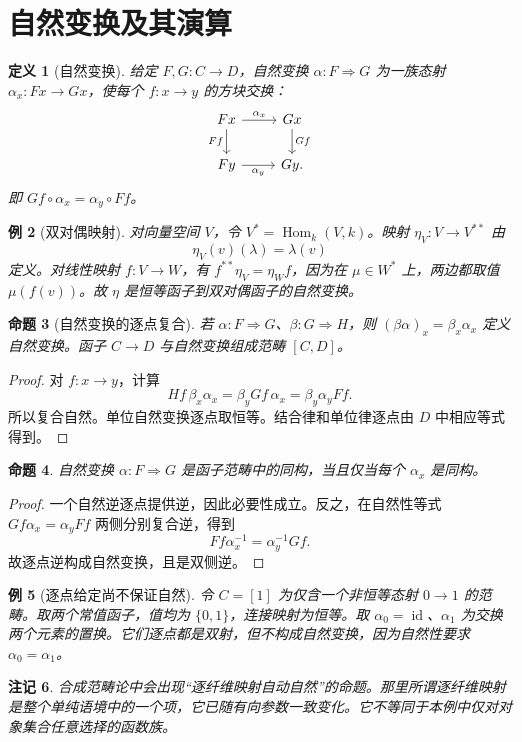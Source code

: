 \documentclass[12pt,oneside,openany,fontset=none]{ctexbook}
\theoremstyle{cn}
\newtheorem{definition}{定义}[chapter]
\newtheorem{example}[definition]{例}
\newtheorem{proposition}[definition]{命题}
\newtheorem{remark}[definition]{注记}
\numberwithin{equation}{chapter}
\newcommand{\id}{\operatorname{id}}
\newcommand{\Hom}{\operatorname{Hom}}
\begin{document}
\section{自然变换及其演算}
\begin{definition}[自然变换]
给定 $F,G:C\to D$，自然变换 $\alpha:F\Rightarrow G$ 为一族态射 $\alpha_x:Fx\to Gx$，使每个 $f:x\to y$ 的方块交换：
\[
\begin{tikzcd}
Fx\ar[r,"\alpha_x"]\ar[d,"Ff"']&Gx\ar[d,"Gf"]\\
Fy\ar[r,"\alpha_y"']&Gy.
\end{tikzcd}
\]
即 $Gf\circ\alpha_x=\alpha_y\circ Ff$。
\end{definition}
\begin{example}[双对偶映射]
对向量空间 $V$，令 $V^*=\Hom_k(V,k)$。映射 $\eta_V:V\to V^{**}$ 由
\[
\eta_V(v)(\lambda)=\lambda(v)
\]
定义。对线性映射 $f:V\to W$，有 $f^{**}\eta_V=\eta_Wf$，因为在 $\mu\in W^*$ 上，两边都取值 $\mu(f(v))$。故 $\eta$ 是恒等函子到双对偶函子的自然变换。
\end{example}
\begin{proposition}[自然变换的逐点复合]
若 $\alpha:F\Rightarrow G$、$\beta:G\Rightarrow H$，则 $(\beta\alpha)_x=\beta_x\alpha_x$ 定义自然变换。函子 $C\to D$ 与自然变换组成范畴 $[C,D]$。
\end{proposition}
\begin{proof}
对 $f:x\to y$，计算
\[
Hf\,\beta_x\alpha_x
=\beta_yGf\,\alpha_x
=\beta_y\alpha_yFf.
\]
所以复合自然。单位自然变换逐点取恒等。结合律和单位律逐点由 $D$ 中相应等式得到。
\end{proof}
\begin{proposition}
自然变换 $\alpha:F\Rightarrow G$ 是函子范畴中的同构，当且仅当每个 $\alpha_x$ 是同构。
\end{proposition}
\begin{proof}
一个自然逆逐点提供逆，因此必要性成立。反之，在自然性等式
$Gf\alpha_x=\alpha_yFf$ 两侧分别复合逆，得到
\[
Ff\alpha_x^{-1}=\alpha_y^{-1}Gf.
\]
故逐点逆构成自然变换，且是双侧逆。
\end{proof}
\begin{example}[逐点给定尚不保证自然]
令 $C=[1]$ 为仅含一个非恒等态射 $0\to1$ 的范畴。取两个常值函子，值均为 $\{0,1\}$，连接映射为恒等。取 $\alpha_0=\id$、$\alpha_1$ 为交换两个元素的置换。它们逐点都是双射，但不构成自然变换，因为自然性要求 $\alpha_0=\alpha_1$。
\end{example}
\begin{remark}
合成范畴论中会出现“逐纤维映射自动自然”的命题。那里所谓逐纤维映射是整个单纯语境中的一个项，它已随有向参数一致变化。它不等同于本例中仅对对象集合任意选择的函数族。
\end{remark}
\end{document}
